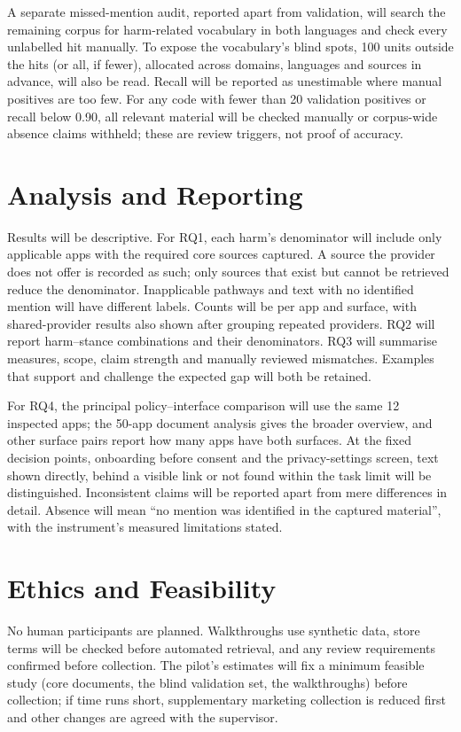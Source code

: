 \documentclass[twoside,its]{bossthesis}
\begin{document}
A separate missed-mention audit, reported apart from validation, will search
the remaining corpus for harm-related vocabulary in both languages and check
every unlabelled hit manually. To expose the vocabulary's blind spots, 100
units outside the hits (or all, if fewer), allocated across domains, languages
and sources in advance, will also be read. Recall will be reported as
unestimable where manual positives are too few. For any code with fewer than
20 validation positives or recall below 0.90, all relevant material will be
checked manually or corpus-wide absence claims withheld; these are review
triggers, not proof of accuracy.

\section{Analysis and Reporting} Results will be descriptive. For RQ1, each harm's denominator
will include only applicable apps with the required core sources captured. A
source the provider does not offer is recorded as such; only sources that
exist but cannot be retrieved reduce the denominator. Inapplicable pathways
and text with no identified mention will have different labels. Counts will be per app and surface, with
shared-provider results also shown after grouping repeated providers.
RQ2 will report harm--stance combinations and their denominators. RQ3 will
summarise measures, scope, claim strength and manually reviewed mismatches.
Examples that support and challenge the expected gap will both be retained.

For RQ4, the principal policy--interface comparison will use the same 12
inspected apps; the 50-app document analysis gives the broader overview, and
other surface pairs report how many apps have both surfaces. At the fixed
decision points, onboarding before consent and the privacy-settings screen,
text shown directly, behind a visible link or not found within the task limit
will be distinguished. Inconsistent claims will be reported apart from mere
differences in detail. Absence will mean \enquote{no mention was identified
in the captured material}, with the instrument's measured limitations stated.

\section{Ethics and Feasibility} No human participants are planned.
Walkthroughs use synthetic data, store terms will be checked before automated
retrieval, and any review requirements confirmed before collection. The
pilot's estimates will fix a minimum feasible study (core documents, the blind
validation set, the walkthroughs) before collection; if time runs short,
supplementary marketing collection is reduced first and other changes are
agreed with the supervisor.
\end{document}
